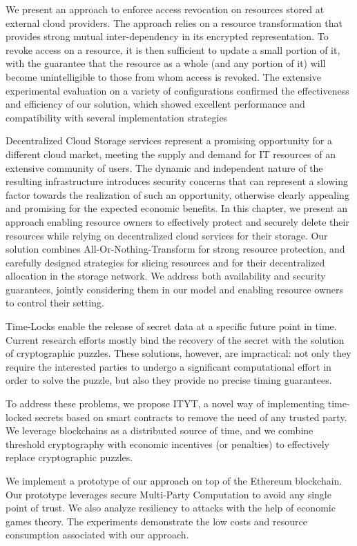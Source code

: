 


We present an approach to enforce access revocation on resources stored at external cloud providers. The approach relies on a resource transformation that provides strong mutual inter-dependency in its encrypted representation. To revoke access on a resource, it is then sufficient to update a small portion of it, with the guarantee that the resource as a whole (and any portion of it) will become unintelligible to those from whom access is revoked. The extensive experimental evaluation on a variety of configurations confirmed the effectiveness and efficiency of our solution, which showed excellent performance and compatibility with several implementation strategies


Decentralized Cloud Storage services represent a promising opportunity
for a different cloud market, meeting the supply and demand for IT
resources of an extensive community of users.  The dynamic and
independent nature of the resulting infrastructure introduces security
concerns that can represent a slowing factor towards the realization
of such an opportunity, otherwise clearly appealing and promising for
the expected economic benefits.  In this chapter, we present an approach
enabling resource owners to effectively protect and securely delete
their resources while relying on decentralized cloud services for
their storage. Our solution combines All-Or-Nothing-Transform for
strong resource protection, and carefully designed strategies for
slicing resources and for their decentralized allocation in the
storage network.  We address both availability and security
guarantees, jointly considering them in our model and enabling
resource owners to control their setting.


Time-Locks enable the release of secret data at a specific future point in time.
Current research efforts mostly bind the recovery of the secret with the solution of cryptographic puzzles.
These solutions, however, are  impractical: 
not only they require the interested parties to undergo a significant computational effort in order to solve the puzzle, but also they provide no precise timing guarantees.

To address these problems, we propose ITYT, a novel way of implementing time-locked secrets based on smart contracts to remove the need of any trusted party.
We leverage blockchains as a distributed source of time, and we combine threshold cryptography with economic incentives (or penalties) to effectively replace cryptographic puzzles.


We implement a prototype of our approach on top of the Ethereum blockchain. Our prototype leverages secure Multi-Party Computation to avoid any single point of trust.
We also analyze resiliency to attacks with the help of economic games theory.
The experiments demonstrate the low costs and resource consumption associated with our approach.  


